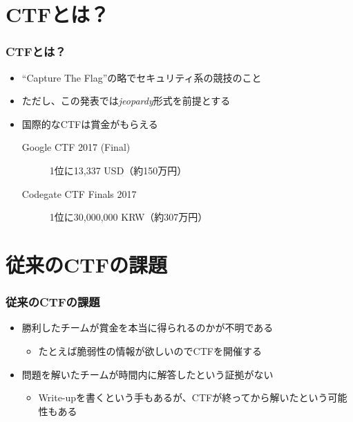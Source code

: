\section{CTFとは？}

\begin{frame}
  \frametitle{CTFとは？}

  \pause
  \begin{itemize}
    \item<+-> ``Capture The Flag''の略でセキュリティ系の競技のこと
    \item<+-> ただし、この発表では\emph{jeopardy}形式を前提とする
  \end{itemize}


  \begin{itemize}
    \item<+-> 国際的なCTFは賞金がもらえる
    \begin{description}
      \item[Google CTF 2017 (Final)] 1位に13,337 USD（約150万円）
      \item[Codegate CTF Finals 2017] 1位に30,000,000 KRW（約307万円）
    \end{description}
  \end{itemize}
\end{frame}

\section{従来のCTFの課題}

\begin{frame}
  \frametitle{従来のCTFの課題}

  \pause
  \begin{itemize}
    \item<+-> 勝利したチームが賞金を本当に得られるのかが不明である
    \begin{itemize}
      \item たとえば脆弱性の情報が欲しいのでCTFを開催する
    \end{itemize}

    \item<+-> 問題を解いたチームが時間内に解答したという証拠がない
    \begin{itemize}
      \item Write-upを書くという手もあるが、CTFが終ってから解いたという可能性もある
    \end{itemize}
  \end{itemize}
\end{frame}

